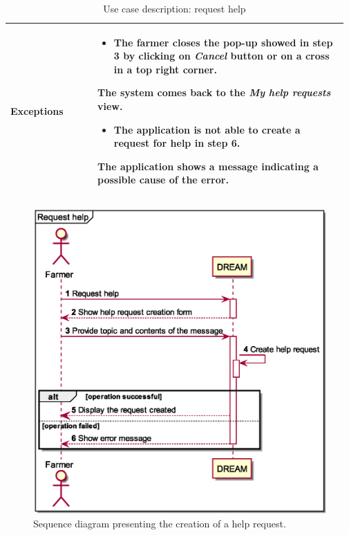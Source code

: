 \begin{table}[H]
\begin{tabular}{@{}p{0.25\linewidth} p{0.72\linewidth}@{}}
		\textbf{Exceptions}         & \begin{itemize}[leftmargin=.4cm,noitemsep,topsep=0pt,before=\vspace{-3mm}]
		   \item The farmer closes the pop-up showed in step 3 by clicking on \textit{Cancel} button or on a  cross in a top right corner.
		\end{itemize}
	    The system comes back to the \textit{My help requests} view.
	    \begin{itemize}[leftmargin=.4cm,noitemsep,topsep=0pt]
		   \item The application is not able to create a request for help in step 6. 
		\end{itemize}
		The application shows a message indicating a possible cause of the error.\\
		\bottomrule
	\end{tabular}
	\caption{Use case description: request help} 
\end{table}

\begin{figure}[H]
    \centering
    \includegraphics[scale=0.6, keepaspectratio, origin=c]{diagrams/sequence/request_help}
    \caption{Sequence diagram presenting the creation of a help request.}
    \label{fig:sd_request_help}
\end{figure}

